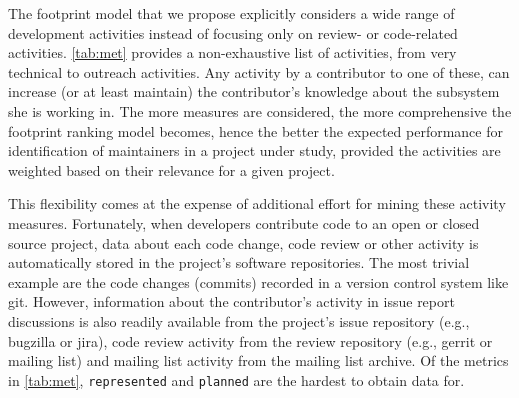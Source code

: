 The footprint model that we propose explicitly considers a wide range of development activities instead of focusing only on review- or code-related activities. \autoref{tab:met} provides a non-exhaustive list of activities, from very technical to outreach activities. Any activity by a contributor to one of these, can increase (or at least maintain) the contributor's knowledge about the subsystem she is working in. The more measures are considered, the more comprehensive the footprint ranking model becomes, hence the better the expected performance for identification of maintainers in a project under study, provided the activities are weighted based on their relevance for a given project.

This flexibility comes at the expense of additional effort for mining these activity measures. %
Fortunately, when developers contribute code to an open or closed source project, data about each code change, code review or other activity is automatically stored in the project's software repositories. The most trivial example are the code changes (commits) recorded in a version control system like git. However, information about the contributor's activity in issue report discussions is also readily available from the project's issue repository (e.g., bugzilla or jira), code review activity from the review repository (e.g., gerrit or mailing list) and mailing list activity from the mailing list archive. Of the metrics in \autoref{tab:met}, \texttt{represented} and \texttt{planned} are the hardest to obtain data for. 
%
%
%




